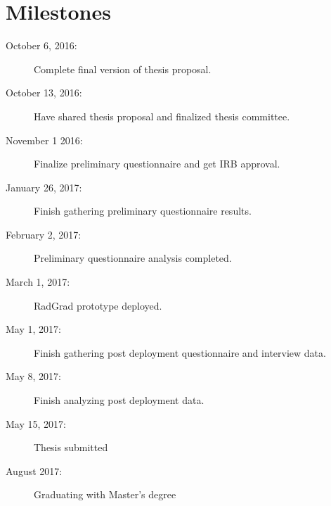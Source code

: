 \chapter{Milestones}
\begin{description}
\item[October 6, 2016:] Complete final version of thesis proposal. 
\item[October 13, 2016:] Have shared thesis proposal and finalized thesis committee.
\item[November 1 2016:] Finalize preliminary questionnaire and get IRB approval.
\item[January 26, 2017:] Finish gathering preliminary questionnaire results.
\item[February 2, 2017:] Preliminary questionnaire analysis completed.
\item[March 1, 2017:] RadGrad prototype deployed.
\item[May 1, 2017:] Finish gathering post deployment questionnaire and interview data.
\item[May 8, 2017:] Finish analyzing post deployment data.
\item[May 15, 2017:] Thesis submitted
\item[August 2017:] Graduating with Master's degree
\end{description}